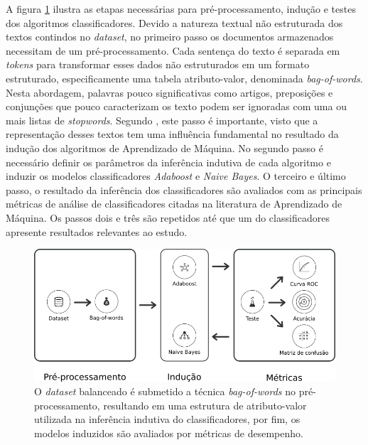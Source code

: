 A figura \ref{figure:metodologia_3} ilustra as etapas necessárias para 
pré-processamento, indução e testes dos algoritmos classificadores. Devido a 
natureza textual não estruturada dos textos contindos no \textit{dataset}, no 
primeiro passo os documentos armazenados necessitam de um pré-processamento. 
Cada sentença do texto é separada em \textit{tokens} para transformar esses 
dados não estruturados em um formato estruturado, especificamente uma tabela 
atributo-valor, denominada \textit{bag-of-words}. Nesta abordagem, palavras 
pouco significativas como artigos, preposições e conjunções que pouco 
caracterizam os texto podem ser ignoradas com uma ou mais listas de 
\textit{stopwords}. Segundo \cite{matsubara2003pretext}, este passo é 
importante, visto que a representação desses textos tem uma influência 
fundamental no resultado da indução dos algoritmos de Aprendizado de Máquina. 
No segundo passo é necessário definir os parâmetros da inferência indutiva de 
cada algoritmo e induzir os modelos classificadores \textit{Adaboost} e 
\textit{Naive Bayes}. O terceiro e último passo, o resultado da inferência dos 
classificadores são avaliados com as principais métricas de análise de 
classificadores citadas na literatura de Aprendizado de Máquina. Os passos 
dois e três são repetidos até que um do classificadores apresente resultados 
relevantes ao estudo.

\begin{figure}[H]
\begin{center}
    \includegraphics[scale=0.70]{images/metodologia_3.png}
\end{center}
\caption{O \textit{dataset} balanceado é submetido a técnica 
\textit{bag-of-words} no pré-processamento, resultando em uma estrutura de 
atributo-valor utilizada na inferência indutiva do classificadores, por fim, os 
modelos induzidos são avaliados por métricas de desempenho.}
\label{figure:metodologia_3}
\end{figure}